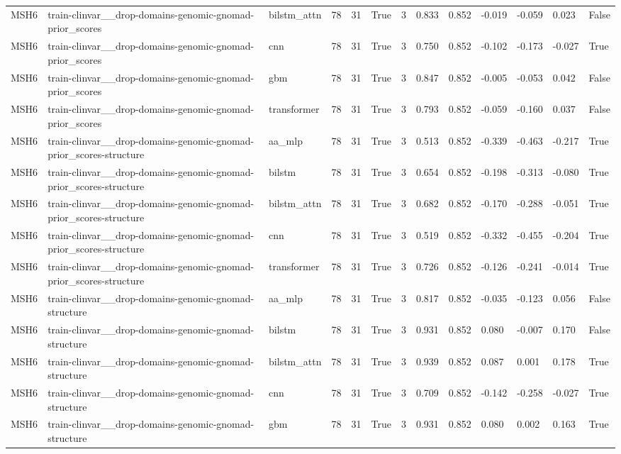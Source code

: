 \begin{table}[t]
\begin{tabular}{lllllllllllll}
MSH6 & train-clinvar\_\_drop-domains-genomic-gnomad-prior\_scores & bilstm\_attn & 78 & 31 & True & 3 & 0.833 & 0.852 & -0.019 & -0.059 & 0.023 & False \\
MSH6 & train-clinvar\_\_drop-domains-genomic-gnomad-prior\_scores & cnn & 78 & 31 & True & 3 & 0.750 & 0.852 & -0.102 & -0.173 & -0.027 & True \\
MSH6 & train-clinvar\_\_drop-domains-genomic-gnomad-prior\_scores & gbm & 78 & 31 & True & 3 & 0.847 & 0.852 & -0.005 & -0.053 & 0.042 & False \\
MSH6 & train-clinvar\_\_drop-domains-genomic-gnomad-prior\_scores & transformer & 78 & 31 & True & 3 & 0.793 & 0.852 & -0.059 & -0.160 & 0.037 & False \\
MSH6 & train-clinvar\_\_drop-domains-genomic-gnomad-prior\_scores-structure & aa\_mlp & 78 & 31 & True & 3 & 0.513 & 0.852 & -0.339 & -0.463 & -0.217 & True \\
MSH6 & train-clinvar\_\_drop-domains-genomic-gnomad-prior\_scores-structure & bilstm & 78 & 31 & True & 3 & 0.654 & 0.852 & -0.198 & -0.313 & -0.080 & True \\
MSH6 & train-clinvar\_\_drop-domains-genomic-gnomad-prior\_scores-structure & bilstm\_attn & 78 & 31 & True & 3 & 0.682 & 0.852 & -0.170 & -0.288 & -0.051 & True \\
MSH6 & train-clinvar\_\_drop-domains-genomic-gnomad-prior\_scores-structure & cnn & 78 & 31 & True & 3 & 0.519 & 0.852 & -0.332 & -0.455 & -0.204 & True \\
MSH6 & train-clinvar\_\_drop-domains-genomic-gnomad-prior\_scores-structure & transformer & 78 & 31 & True & 3 & 0.726 & 0.852 & -0.126 & -0.241 & -0.014 & True \\
MSH6 & train-clinvar\_\_drop-domains-genomic-gnomad-structure & aa\_mlp & 78 & 31 & True & 3 & 0.817 & 0.852 & -0.035 & -0.123 & 0.056 & False \\
MSH6 & train-clinvar\_\_drop-domains-genomic-gnomad-structure & bilstm & 78 & 31 & True & 3 & 0.931 & 0.852 & 0.080 & -0.007 & 0.170 & False \\
MSH6 & train-clinvar\_\_drop-domains-genomic-gnomad-structure & bilstm\_attn & 78 & 31 & True & 3 & 0.939 & 0.852 & 0.087 & 0.001 & 0.178 & True \\
MSH6 & train-clinvar\_\_drop-domains-genomic-gnomad-structure & cnn & 78 & 31 & True & 3 & 0.709 & 0.852 & -0.142 & -0.258 & -0.027 & True \\
MSH6 & train-clinvar\_\_drop-domains-genomic-gnomad-structure & gbm & 78 & 31 & True & 3 & 0.931 & 0.852 & 0.080 & 0.002 & 0.163 & True \\

\end{tabular}
\end{table}
